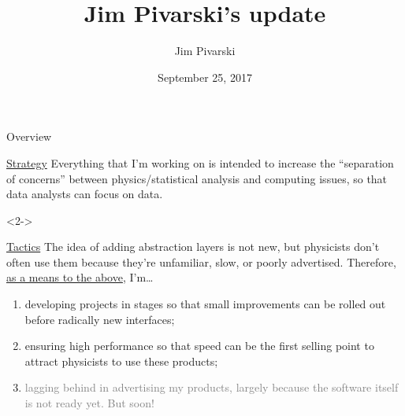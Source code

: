 \documentclass{beamer}
\title[2017-09-25-dianahep-update]{Jim Pivarski's update}
\author{Jim Pivarski}
\institute{Princeton University -- DIANA}
\date{September 25, 2017}
\begin{document}

\begin{frame}
  \titlepage
\end{frame}




\begin{frame}{Overview}
\vspace{0.25 cm}
\begin{block}{\hspace{4 cm} \underline{Strategy}}
Everything that I'm working on is intended to increase the ``separation of concerns'' between physics/statistical analysis and computing issues, so that data analysts can focus on data.
\end{block}

\begin{uncoverenv}<2->
\begin{block}{\hspace{4 cm} \underline{Tactics}}
The idea of adding abstraction layers is not new, but physicists don't often use them because they're unfamiliar, slow, or poorly advertised. Therefore, \underline{as a means to the above}, I'm\ldots
\begin{enumerate}
\item<3-> developing projects in stages so that small improvements can be rolled out before radically new interfaces;
\item<4-> ensuring high performance so that speed can be the first selling point to attract physicists to use these products;
\item<5-> \textcolor{gray}{lagging behind in advertising my products, largely because the software itself is not ready yet. But soon!}
\end{enumerate}
\end{block}
\end{uncoverenv}
\end{frame}
\end{document}
